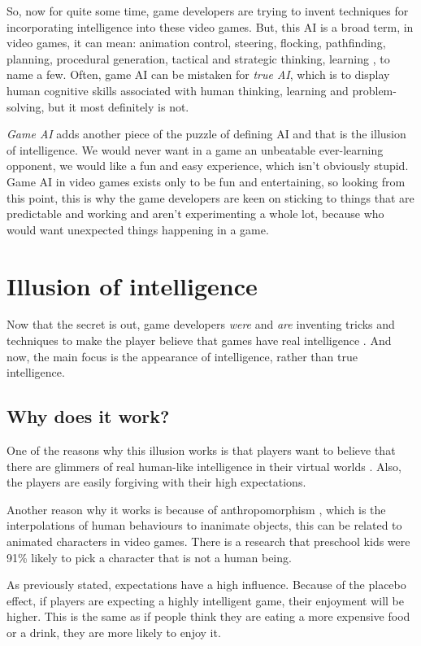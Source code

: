 \documentclass[a4paper, 12pt]{book}
\begin{document}
So, now for quite some time, game developers are trying to invent techniques for incorporating intelligence into these video games. But, this AI is a broad term, in video games, it can mean: animation control, steering, flocking, pathfinding, planning, procedural generation, tactical and strategic thinking, learning \cite{FuzzyAIGames}, to name a few. Often, game AI can be mistaken for \emph{true AI}, which is to display human cognitive skills associated with human thinking, learning and problem-solving, but it most definitely is not.

\emph{Game AI} adds another piece of the puzzle of defining AI and that is the illusion of intelligence. We would never want in a game an unbeatable ever-learning opponent, we would like a fun and easy experience, which isn't obviously stupid. Game AI in video games exists only to be fun and entertaining, so looking from this point, this is why the game developers are keen on sticking to things that are predictable and working and aren't experimenting a whole lot, because who would want unexpected things happening in a game.

\section{Illusion of intelligence}
Now that the secret is out, game developers \emph{were} and \emph{are} inventing tricks and techniques to make the player believe that games have real intelligence \cite{IllusionOfIntelligece}. And now, the main focus is the appearance of intelligence, rather than true intelligence.

\subsection{Why does it work?}
One of the reasons why this illusion works is that players want to believe that there are glimmers of real human-like intelligence in their virtual worlds \cite{IllusionOfIntelligece}. Also, the players are easily forgiving with their high expectations.

Another reason why it works is because of anthropomorphism \cite{AnthropomorphicCharacters}, which is the interpolations of human behaviours to inanimate objects, this can be related to animated characters in video games. There is a research \cite{AnthropomorphicCharacters} that preschool kids were 91\% likely to pick a character that is not a human being.

As previously stated, expectations have a high influence. Because of the placebo effect, if players are expecting a highly intelligent game, their enjoyment will be higher. This is the same as if people think they are eating a more expensive food or a drink, they are more likely to enjoy it.
\end{document}
